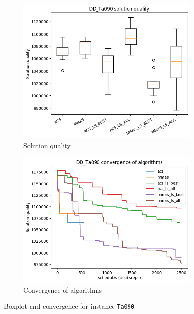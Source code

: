 \documentclass[runningheads]{llncs}
\begin{document}
\begin{figure}[H]
    \begin{subfigure}{.5\textwidth}
        \centering
        \includegraphics[width=1\linewidth]{plots/DD_Ta090__boxplot}
        \caption{Solution quality}
        \label{fig:ta_090:boxplot}
    \end{subfigure}
    \begin{subfigure}{.5\textwidth}
        \centering
        \includegraphics[width=1\linewidth]{plots/DD_Ta090__best_runs_convergence}
        \caption{Convergence of algorithms}
        \label{ig:ta_090:convergence}
    \end{subfigure}
    \caption{Boxplot and convergence for instance \texttt{Ta090}}
    \label{fig:ta_090}
\end{figure}
\end{document}

